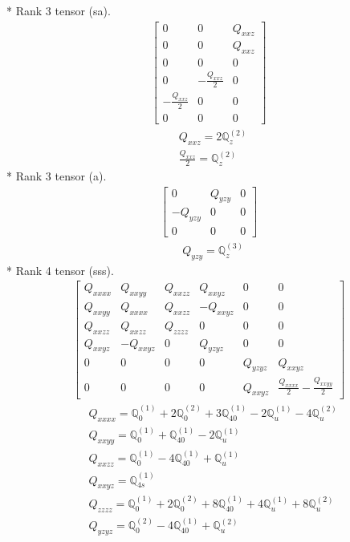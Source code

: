 \documentclass[fleqn,8pt,landscape]{jsarticle}
\begin{document}
* Rank 3 tensor (sa).
\begin{align*}
\begin{bmatrix} 0 & 0 & Q_{xxz} \\ 0 & 0 & Q_{xxz} \\ 0 & 0 & 0 \\ 0 & - \frac{Q_{xxz}}{2} & 0 \\ - \frac{Q_{xxz}}{2} & 0 & 0 \\ 0 & 0 & 0 \end{bmatrix}
\end{align*}
\begin{align*}
& Q_{xxz} = 2 \mathbb{Q}_{z}^{(2)} \\
& \frac{Q_{xxz}}{2} = \mathbb{Q}_{z}^{(2)}
\end{align*}
* Rank 3 tensor (a).
\begin{align*}
\begin{bmatrix} 0 & Q_{yzy} & 0 \\ - Q_{yzy} & 0 & 0 \\ 0 & 0 & 0 \end{bmatrix}
\end{align*}
\begin{align*}
& Q_{yzy} = \mathbb{Q}_{z}^{(3)}
\end{align*}
* Rank 4 tensor (sss).
\begin{align*}
\begin{bmatrix} Q_{xxxx} & Q_{xxyy} & Q_{xxzz} & Q_{xxyz} & 0 & 0 \\ Q_{xxyy} & Q_{xxxx} & Q_{xxzz} & - Q_{xxyz} & 0 & 0 \\ Q_{xxzz} & Q_{xxzz} & Q_{zzzz} & 0 & 0 & 0 \\ Q_{xxyz} & - Q_{xxyz} & 0 & Q_{yzyz} & 0 & 0 \\ 0 & 0 & 0 & 0 & Q_{yzyz} & Q_{xxyz} \\ 0 & 0 & 0 & 0 & Q_{xxyz} & \frac{Q_{xxxx}}{2} - \frac{Q_{xxyy}}{2} \end{bmatrix}
\end{align*}
\begin{align*}
& Q_{xxxx} = \mathbb{Q}_{0}^{(1)} + 2 \mathbb{Q}_{0}^{(2)} + 3 \mathbb{Q}_{40}^{(1)} - 2 \mathbb{Q}_{u}^{(1)} - 4 \mathbb{Q}_{u}^{(2)} \\
& Q_{xxyy} = \mathbb{Q}_{0}^{(1)} + \mathbb{Q}_{40}^{(1)} - 2 \mathbb{Q}_{u}^{(1)} \\
& Q_{xxzz} = \mathbb{Q}_{0}^{(1)} - 4 \mathbb{Q}_{40}^{(1)} + \mathbb{Q}_{u}^{(1)} \\
& Q_{xxyz} = \mathbb{Q}_{4s}^{(1)} \\
& Q_{zzzz} = \mathbb{Q}_{0}^{(1)} + 2 \mathbb{Q}_{0}^{(2)} + 8 \mathbb{Q}_{40}^{(1)} + 4 \mathbb{Q}_{u}^{(1)} + 8 \mathbb{Q}_{u}^{(2)} \\
& Q_{yzyz} = \mathbb{Q}_{0}^{(2)} - 4 \mathbb{Q}_{40}^{(1)} + \mathbb{Q}_{u}^{(2)}
\end{align*}
\end{document}
